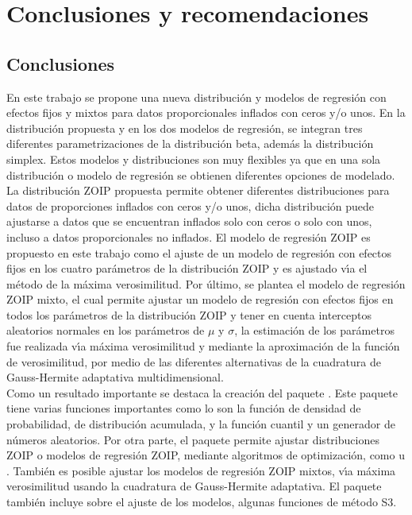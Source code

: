 \chapter{Conclusiones y recomendaciones}\label{cap5}
\section{Conclusiones}

En este trabajo se propone una nueva distribuci\'{o}n y modelos de regresi\'{o}n con efectos fijos y mixtos para datos proporcionales inflados con ceros y/o unos. En la distribuci\'{o}n propuesta y en los dos modelos de regresi\'{o}n, se integran tres diferentes parametrizaciones de la distribuci\'{o}n beta, adem\'{a}s la distribuci\'{o}n simplex. Estos modelos y distribuciones son muy flexibles ya que en una sola distribuci\'{o}n o modelo de regresi\'{o}n se obtienen diferentes opciones de modelado.\\

La distribuci\'{o}n ZOIP propuesta permite obtener diferentes distribuciones para datos de proporciones inflados con ceros y/o unos, dicha distribuci\'{o}n puede ajustarse a datos que se encuentran inflados solo con ceros o solo con unos, incluso a datos proporcionales no inflados. El modelo de regresi\'{o}n ZOIP es propuesto en este trabajo como el ajuste de un modelo de regresi\'{o}n con efectos fijos en los cuatro par\'{a}metros de la distribuci\'{o}n ZOIP y es ajustado v\'{\i}a el m\'{e}todo de la m\'{a}xima verosimilitud. Por \'{u}ltimo, se plantea el modelo de regresi\'{o}n ZOIP mixto, el cual permite ajustar un modelo de regresi\'{o}n con efectos fijos en todos los par\'{a}metros de la distribuci\'{o}n ZOIP y tener en cuenta interceptos aleatorios normales en los par\'{a}metros de $\mu$ y $\sigma$, la estimaci\'{o}n de los par\'{a}metros fue realizada v\'{\i}a m\'{a}xima verosimilitud y mediante la aproximaci\'{o}n de la funci\'{o}n de verosimilitud, por medio de las diferentes alternativas de la cuadratura de Gauss-Hermite adaptativa multidimensional.\\
 
Como un resultado importante se destaca la creaci\'{o}n del paquete . Este paquete tiene varias funciones importantes como lo son la funci\'{o}n de densidad de probabilidad, de distribuci\'{o}n acumulada, y la funci\'{o}n cuantil y un generador de n\'{u}meros aleatorios. Por otra parte, el paquete permite ajustar distribuciones ZOIP o modelos de regresi\'{o}n ZOIP, mediante algoritmos de optimizaci\'{o}n, como  u . Tambi\'{e}n es posible ajustar los modelos de regresi\'{o}n ZOIP mixtos, v\'{\i}a m\'{a}xima verosimilitud usando la cuadratura de Gauss-Hermite adaptativa. El paquete  tambi\'{e}n incluye sobre el ajuste de los modelos, algunas funciones de m\'{e}todo S3.\\

